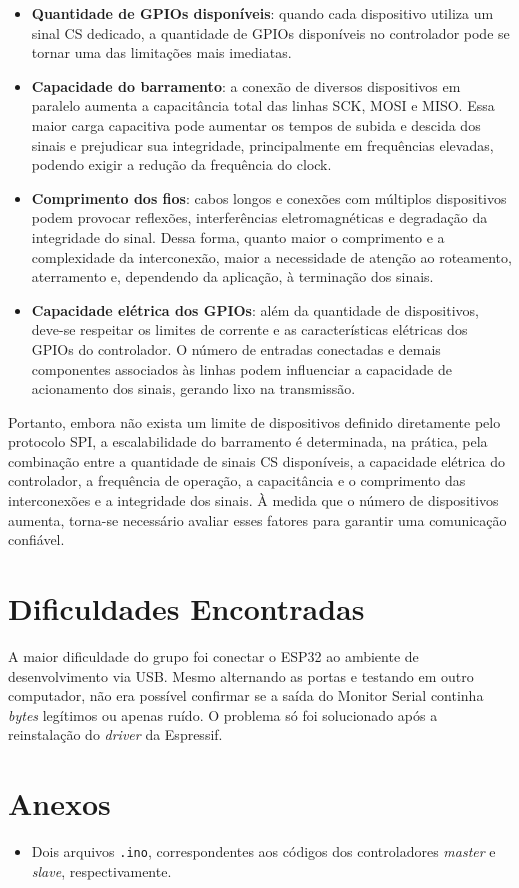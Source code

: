 \documentclass[a4paper,oneside,10pt]{article}
\begin{document}
\begin{itemize}
	\item \textbf{Quantidade de GPIOs disponíveis}: quando cada dispositivo utiliza um sinal CS dedicado, a quantidade de GPIOs disponíveis no controlador pode se tornar uma das limitações mais imediatas. 
	
	\item \textbf{Capacidade do barramento}: a conexão de diversos dispositivos em paralelo aumenta a capacitância total das linhas SCK, MOSI e MISO. Essa maior carga capacitiva pode aumentar os tempos de subida e descida dos sinais e prejudicar sua integridade, principalmente em frequências elevadas, podendo exigir a redução da frequência do clock.
	
	\item \textbf{Comprimento dos fios}: cabos longos e conexões com múltiplos dispositivos podem provocar reflexões, interferências eletromagnéticas e degradação da integridade do sinal. Dessa forma, quanto maior o comprimento e a complexidade da interconexão, maior a necessidade de atenção ao roteamento, aterramento e, dependendo da aplicação, à terminação dos sinais.
	
	\item \textbf{Capacidade elétrica dos GPIOs}: além da quantidade de dispositivos, deve-se respeitar os limites de corrente e as características elétricas dos GPIOs do controlador. O número de entradas conectadas e demais componentes associados às linhas podem influenciar a capacidade de acionamento dos sinais, gerando lixo na transmissão.
\end{itemize}

Portanto, embora não exista um limite de dispositivos definido diretamente pelo protocolo SPI, a escalabilidade do barramento é determinada, na prática, pela combinação entre a quantidade de sinais CS disponíveis, a capacidade elétrica do controlador, a frequência de operação, a capacitância e o comprimento das interconexões e a integridade dos sinais. À medida que o número de dispositivos aumenta, torna-se necessário avaliar esses fatores para garantir uma comunicação confiável.


\section{Dificuldades Encontradas}

A maior dificuldade do grupo foi conectar o ESP32 ao ambiente de desenvolvimento via USB. Mesmo alternando as portas e testando em outro computador, não era possível confirmar se a saída do Monitor Serial continha \textit{bytes} legítimos ou apenas ruído. O problema só foi solucionado após a reinstalação do \textit{driver} da Espressif.

\section{Anexos}

\begin{itemize}
	\item Dois arquivos \texttt{.ino}, correspondentes aos códigos dos controladores \textit{master} e \textit{slave}, respectivamente.
\end{itemize}

\newpage


\end{document}
